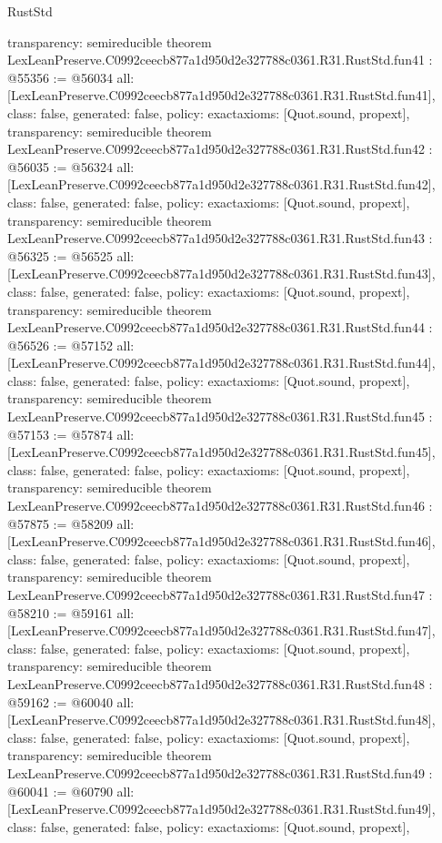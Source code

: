 \begin{lexlean}{RustStd}
\begin{coremodule}
{  transparency: semireducible
}
theorem LexLeanPreserve.C0992ceecb877a1d950d2e327788c0361.R31.RustStd.fun41 : @55356 := @56034 {
  all: [LexLeanPreserve.C0992ceecb877a1d950d2e327788c0361.R31.RustStd.fun41],
  class: false,
  generated: false,
  policy: exact{axioms: [Quot.sound, propext]},
  transparency: semireducible
}
theorem LexLeanPreserve.C0992ceecb877a1d950d2e327788c0361.R31.RustStd.fun42 : @56035 := @56324 {
  all: [LexLeanPreserve.C0992ceecb877a1d950d2e327788c0361.R31.RustStd.fun42],
  class: false,
  generated: false,
  policy: exact{axioms: [Quot.sound, propext]},
  transparency: semireducible
}
theorem LexLeanPreserve.C0992ceecb877a1d950d2e327788c0361.R31.RustStd.fun43 : @56325 := @56525 {
  all: [LexLeanPreserve.C0992ceecb877a1d950d2e327788c0361.R31.RustStd.fun43],
  class: false,
  generated: false,
  policy: exact{axioms: [Quot.sound, propext]},
  transparency: semireducible
}
theorem LexLeanPreserve.C0992ceecb877a1d950d2e327788c0361.R31.RustStd.fun44 : @56526 := @57152 {
  all: [LexLeanPreserve.C0992ceecb877a1d950d2e327788c0361.R31.RustStd.fun44],
  class: false,
  generated: false,
  policy: exact{axioms: [Quot.sound, propext]},
  transparency: semireducible
}
theorem LexLeanPreserve.C0992ceecb877a1d950d2e327788c0361.R31.RustStd.fun45 : @57153 := @57874 {
  all: [LexLeanPreserve.C0992ceecb877a1d950d2e327788c0361.R31.RustStd.fun45],
  class: false,
  generated: false,
  policy: exact{axioms: [Quot.sound, propext]},
  transparency: semireducible
}
theorem LexLeanPreserve.C0992ceecb877a1d950d2e327788c0361.R31.RustStd.fun46 : @57875 := @58209 {
  all: [LexLeanPreserve.C0992ceecb877a1d950d2e327788c0361.R31.RustStd.fun46],
  class: false,
  generated: false,
  policy: exact{axioms: [Quot.sound, propext]},
  transparency: semireducible
}
theorem LexLeanPreserve.C0992ceecb877a1d950d2e327788c0361.R31.RustStd.fun47 : @58210 := @59161 {
  all: [LexLeanPreserve.C0992ceecb877a1d950d2e327788c0361.R31.RustStd.fun47],
  class: false,
  generated: false,
  policy: exact{axioms: [Quot.sound, propext]},
  transparency: semireducible
}
theorem LexLeanPreserve.C0992ceecb877a1d950d2e327788c0361.R31.RustStd.fun48 : @59162 := @60040 {
  all: [LexLeanPreserve.C0992ceecb877a1d950d2e327788c0361.R31.RustStd.fun48],
  class: false,
  generated: false,
  policy: exact{axioms: [Quot.sound, propext]},
  transparency: semireducible
}
theorem LexLeanPreserve.C0992ceecb877a1d950d2e327788c0361.R31.RustStd.fun49 : @60041 := @60790 {
  all: [LexLeanPreserve.C0992ceecb877a1d950d2e327788c0361.R31.RustStd.fun49],
  class: false,
  generated: false,
  policy: exact{axioms: [Quot.sound, propext]},
}
\end{coremodule}
\end{lexlean}
